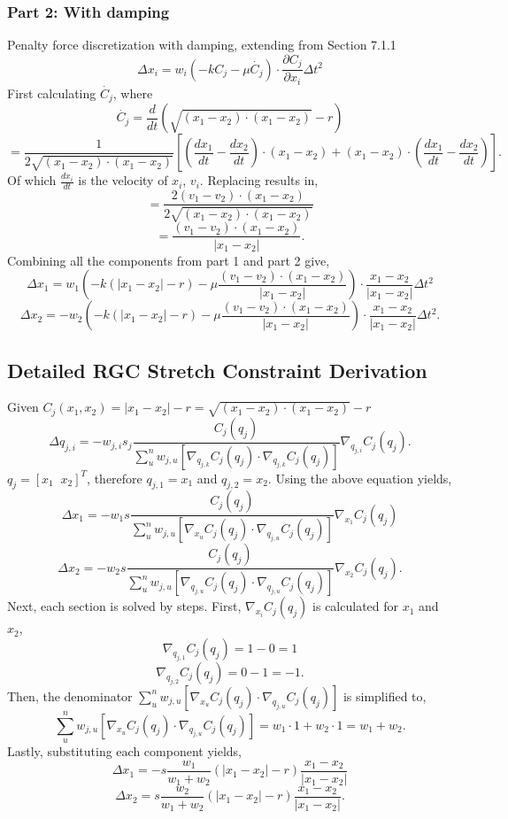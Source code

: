 \documentclass[12pt, letterpaper]{article}
\begin{document}
\subsubsection{Part 2: With damping}
Penalty force discretization with damping, extending from Section 7.1.1
$$\Delta x_{i} = w_{i}(-kC_j - \mu \dot{C_j}) \cdot \frac{\partial C_j}{\partial x_{i}} \Delta t^{2}$$
First calculating $\dot{C_j}$, where
$$\dot{C_j} = \frac{d}{dt}(\sqrt{(x_{1}-x_{2}) \cdot (x_{1}-x_{2})} - r)$$
$$= \frac{1}{2 \sqrt{(x_{1}-x_{2}) \cdot (x_{1}-x_{2})}} \left[ \left( \frac{dx_{1}}{dt} - \frac{dx_{2}}{dt} \right)\cdot (x_{1} - x_{2}) + (x_{1} - x_{2})\cdot \left(\frac{dx_{1}}{dt} - \frac{dx_{2}}{dt}\right) \right] .$$
Of which $\frac{dx_{i}}{dt}$ is the velocity of $x_{i}$, $v_{i}$. Replacing results in, 
$$= \frac{2 (v_{1} - v_{2})\cdot (x_{1} - x_{2})}{2 \sqrt{(x_{1}-x_{2}) \cdot (x_{1}-x_{2})}}$$
$$= \frac{(v_{1} - v_{2}) \cdot (x_{1} - x_{2})}{|x_{1}-x_{2}|}.$$
Combining all the components from part 1 and part 2 give, 
$$\Delta x_{1} = w_{1}\left(-k(|x_{1}-x_{2}|-r) - \mu \frac{(v_{1} - v_{2}) \cdot (x_{1} - x_{2})}{|x_{1}-x_{2}|}\right) \cdot \frac{x_{1}-x_{2}}{|x_{1}-x_{2}|} \Delta t^{2}$$
$$\Delta x_{2} = -w_{2}\left(-k(|x_{1}-x_{2}|-r) - \mu \frac{(v_{1} - v_{2}) \cdot (x_{1} - x_{2})}{|x_{1}-x_{2}|}\right) \cdot \frac{x_{1}-x_{2}}{|x_{1}-x_{2}|} \Delta t^{2}.$$

\subsection{Detailed RGC Stretch Constraint Derivation}
Given $C_j(x_{1},x_{2}) = |x_{1}-x_{2}|-r = \sqrt{(x_{1}-x_{2}) \cdot (x_{1}-x_{2})} - r $
$$ \Delta q_{j,i} = -w_{j,i} s_j \frac{C_j(q_j)}{\sum\limits^{n}_{u} w_{j,u}[ \nabla_{q_{j,k}}C_j(q_j) \cdot \nabla_{q_{j,k}}C_j(q_j)]} \nabla_{q_{j,i}}C_j(q_j).$$
$q_j = [x_1\;\;x_2]^T$, therefore $q_{j,1} = x_1$ and $q_{j,2} = x_2$. Using the above equation yields, 
$$\Delta x_{1} = -w_{1} s \frac{C_j(q_j)}{\sum\limits^{n}_{u} w_{j,u}[ \nabla_{x_{u}}C_j(q_j) \cdot \nabla_{q_{j,u}}C_j(q_j)]}\nabla_{x_{1}}C_j(q_j)$$ 
 $$\Delta x_{2} = -w_{2} s \frac{C_j(q_j)}{\sum\limits^{n}_{u} w_{j,u}[ \nabla_{q_{j,u}}C_j(q_j) \cdot \nabla_{q_{j,u}}C_j(q_j)]}\nabla_{x_{2}}C_j(q_j).$$
Next, each section is solved by steps. First, $\nabla_{x_{i}}C_j(q_j)$ is calculated for $x_1$ and $x_2$,
$$ \nabla_{q_{j,1}}C_j(q_j) = 1 - 0 = 1$$ 
$$\nabla_{q_{j,2}}C_j(q_j) = 0 - 1 = -1.$$
Then, the denominator $\sum\limits^{n}_{u} w_{j,u}[ \nabla_{x_{u}}C_j(q_j) \cdot \nabla_{q_{j,u}}C_j(q_j)]$ is simplified to, 
$$\sum\limits^{n}_{u} w_{j,u}[ \nabla_{x_{u}}C_j(q_j) \cdot \nabla_{q_{j,u}}C_j(q_j)] = w_{1} \cdot 1 + w_{2} \cdot 1 = w_{1} + w_{2}. $$
Lastly, substituting each component yields,
$$\Delta x_{1} = -s\frac{w_{1}}{w_{1}+w_{2}}(|x_{1} - x_{2}|-r) \frac{x_{1} - x_{2}}{|x_{1} - x_{2}|}$$ 
$$\Delta x_{2} = s\frac{w_{2}}{w_{1}+w_{2}}(|x_{1} - x_{2}|-r) \frac{x_{1} - x_{2}}{|x_{1} - x_{2}|}.$$


\end{document}
